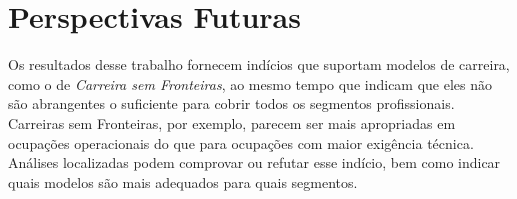 \documentclass[
  article,
  11pt,
  a4paper,
  english,
  brazil,
  sumario=tradicional]{abntex2}
\begin{document}

\section{Perspectivas Futuras}

Os resultados desse trabalho fornecem indícios que suportam modelos de carreira, como o de \textit{Carreira sem Fronteiras}, ao mesmo tempo que indicam que eles não são abrangentes o suficiente para cobrir todos os segmentos profissionais. Carreiras sem Fronteiras, por exemplo, parecem ser mais apropriadas em ocupações operacionais do que para ocupações com maior exigência técnica. Análises localizadas podem comprovar ou refutar esse indício, bem como indicar quais modelos são mais adequados para quais segmentos.
\end{document}
